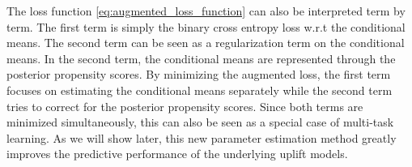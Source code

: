 \documentclass{article}
\def\tt{\mathbf t}
\def\x{\mathbf x}
\def\y{\mathbf y}
\begin{document}
%
%
%
%
The loss function \eqref{eq:augmented_loss_function} can also be interpreted term by term. The first term is simply the binary cross entropy loss w.r.t the conditional means. The second term can be seen as a regularization term on the conditional means. In the second term, the conditional means are represented through the posterior propensity scores. By minimizing the augmented loss, the first term focuses on estimating the conditional means separately while the second term tries to correct for the posterior propensity scores. Since both terms are minimized simultaneously, this can also be seen as a special case of multi-task learning. As we will show later, this new parameter estimation method greatly improves the predictive performance of the underlying uplift models.
\end{document}
